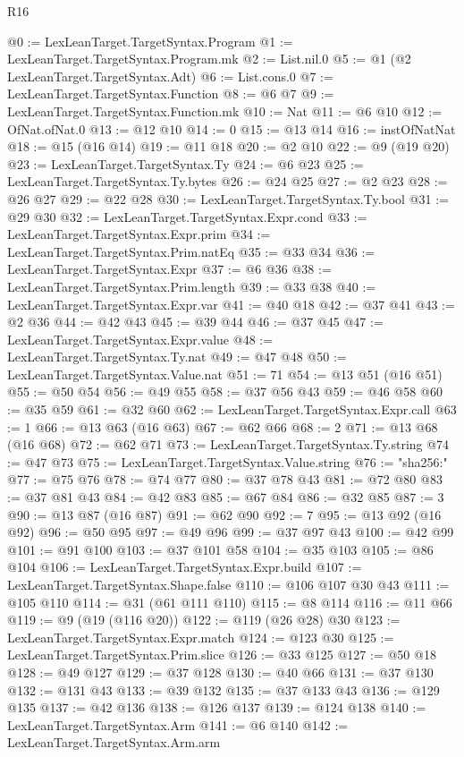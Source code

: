 \begin{lexlean}{R16}
\begin{coremodule}
{{{{{{{{{{{{{{{{{@0 := LexLeanTarget.TargetSyntax.Program
@1 := LexLeanTarget.TargetSyntax.Program.mk
@2 := List.nil.{0}
@5 := @1 (@2 LexLeanTarget.TargetSyntax.Adt)
@6 := List.cons.{0}
@7 := LexLeanTarget.TargetSyntax.Function
@8 := @6 @7
@9 := LexLeanTarget.TargetSyntax.Function.mk
@10 := Nat
@11 := @6 @10
@12 := OfNat.ofNat.{0}
@13 := @12 @10
@14 := 0
@15 := @13 @14
@16 := instOfNatNat
@18 := @15 (@16 @14)
@19 := @11 @18
@20 := @2 @10
@22 := @9 (@19 @20)
@23 := LexLeanTarget.TargetSyntax.Ty
@24 := @6 @23
@25 := LexLeanTarget.TargetSyntax.Ty.bytes
@26 := @24 @25
@27 := @2 @23
@28 := @26 @27
@29 := @22 @28
@30 := LexLeanTarget.TargetSyntax.Ty.bool
@31 := @29 @30
@32 := LexLeanTarget.TargetSyntax.Expr.cond
@33 := LexLeanTarget.TargetSyntax.Expr.prim
@34 := LexLeanTarget.TargetSyntax.Prim.natEq
@35 := @33 @34
@36 := LexLeanTarget.TargetSyntax.Expr
@37 := @6 @36
@38 := LexLeanTarget.TargetSyntax.Prim.length
@39 := @33 @38
@40 := LexLeanTarget.TargetSyntax.Expr.var
@41 := @40 @18
@42 := @37 @41
@43 := @2 @36
@44 := @42 @43
@45 := @39 @44
@46 := @37 @45
@47 := LexLeanTarget.TargetSyntax.Expr.value
@48 := LexLeanTarget.TargetSyntax.Ty.nat
@49 := @47 @48
@50 := LexLeanTarget.TargetSyntax.Value.nat
@51 := 71
@54 := @13 @51 (@16 @51)
@55 := @50 @54
@56 := @49 @55
@58 := @37 @56 @43
@59 := @46 @58
@60 := @35 @59
@61 := @32 @60
@62 := LexLeanTarget.TargetSyntax.Expr.call
@63 := 1
@66 := @13 @63 (@16 @63)
@67 := @62 @66
@68 := 2
@71 := @13 @68 (@16 @68)
@72 := @62 @71
@73 := LexLeanTarget.TargetSyntax.Ty.string
@74 := @47 @73
@75 := LexLeanTarget.TargetSyntax.Value.string
@76 := "sha256:"
@77 := @75 @76
@78 := @74 @77
@80 := @37 @78 @43
@81 := @72 @80
@83 := @37 @81 @43
@84 := @42 @83
@85 := @67 @84
@86 := @32 @85
@87 := 3
@90 := @13 @87 (@16 @87)
@91 := @62 @90
@92 := 7
@95 := @13 @92 (@16 @92)
@96 := @50 @95
@97 := @49 @96
@99 := @37 @97 @43
@100 := @42 @99
@101 := @91 @100
@103 := @37 @101 @58
@104 := @35 @103
@105 := @86 @104
@106 := LexLeanTarget.TargetSyntax.Expr.build
@107 := LexLeanTarget.TargetSyntax.Shape.false
@110 := @106 @107 @30 @43
@111 := @105 @110
@114 := @31 (@61 @111 @110)
@115 := @8 @114
@116 := @11 @66
@119 := @9 (@19 (@116 @20))
@122 := @119 (@26 @28) @30
@123 := LexLeanTarget.TargetSyntax.Expr.match
@124 := @123 @30
@125 := LexLeanTarget.TargetSyntax.Prim.slice
@126 := @33 @125
@127 := @50 @18
@128 := @49 @127
@129 := @37 @128
@130 := @40 @66
@131 := @37 @130
@132 := @131 @43
@133 := @39 @132
@135 := @37 @133 @43
@136 := @129 @135
@137 := @42 @136
@138 := @126 @137
@139 := @124 @138
@140 := LexLeanTarget.TargetSyntax.Arm
@141 := @6 @140
@142 := LexLeanTarget.TargetSyntax.Arm.arm
}}}}}}}}}}}}}}}}}
\end{coremodule}
\end{lexlean}
